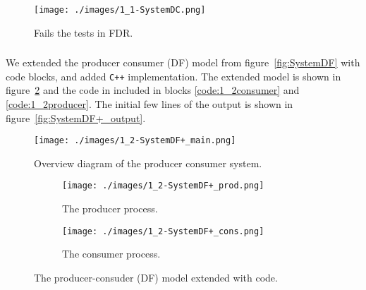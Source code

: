 \documentclass[a4paper,twoside,11pt]{article}
\newcommand{\cpp}{{\tt C++} }
\begin{document}
\begin{figure}
 \centering
 \texttt{[image: ./images/1\_1-SystemDC.png]}
 \caption{Fails the tests in FDR.}
 \label{fig:FDR_DC}
\end{figure}

\FloatBarrier
\subsubsection{}
We extended the producer consumer (DF) model from figure~\ref{fig:SystemDF} with code blocks, and added \cpp implementation. The extended model is shown in figure~\ref{fig:SystemDF+} and the code in included in blocks \ref{code:1_2consumer} and \ref{code:1_2producer}. The initial few lines of the output is shown in figure~\ref{fig:SystemDF+_output}.

\begin{figure}
 \centering
  \texttt{[image: ./images/1\_2-SystemDF+\_main.png]}
  \caption{Overview diagram of the producer consumer system.}
 \begin{subfigure}{0.5\textwidth}
  \centering
	\texttt{[image: ./images/1\_2-SystemDF+\_prod.png]}
	\caption{The producer process.}
 \end{subfigure}%
 \begin{subfigure}{0.5\textwidth}
  \centering
	\texttt{[image: ./images/1\_2-SystemDF+\_cons.png]}
	\caption{The consumer process.}
 \end{subfigure}
 \caption{The producer-consuder (DF) model extended with code.}
 \label{fig:SystemDF+}
\end{figure}
\end{document}
